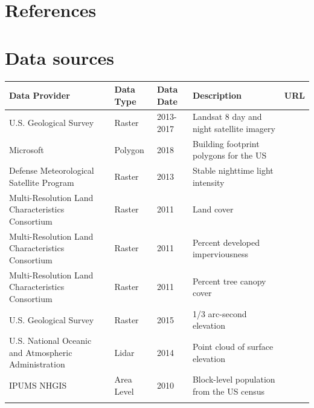 \documentclass[]{elsarticle}
\begin{document}



\section*{References}



\appendix
\section{Data sources}

\begin{tabu}to \textwidth{ X[l]  X[c]  X[c] X[l] X[l] }
 \hline
 Data Provider & Data Type & Data Date & Description & URL \\
 \hline
U.S. Geological Survey  & Raster  & 2013-2017 &
    Landsat 8 day and night satellite imagery &  \\
Microsoft  & Polygon  & 2018 & Building footprint polygons for the US &
     \\
Defense Meteorological Satellite Program  & Raster  & 2013 &
    Stable nighttime light intensity &  \\
Multi-Resolution Land Characteristics Consortium  & Raster  & 2011 &
    Land cover &  \\
Multi-Resolution Land Characteristics Consortium  & Raster  & 2011 &
    Percent developed imperviousness &  \\
Multi-Resolution Land Characteristics Consortium  & Raster  & 2011 &
    Percent tree canopy cover &  \\
U.S. Geological Survey  & Raster  & 2015 & 1/3 arc-second elevation &
     \\
U.S. National Oceanic and Atmospheric Administration  & Lidar  & 2014 & Point cloud of surface elevation &
     \\
IPUMS NHGIS  & Area Level  & 2010 &
    Block-level population from the US census & \cite{nhgis}\\
\hline
\label{tab:data}
\end{tabu}
\end{document}

